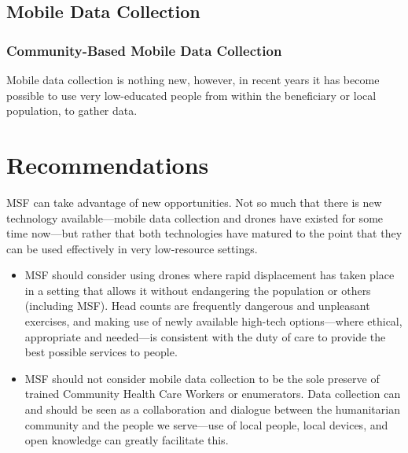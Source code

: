 \documentclass[a4paper,12pt,twoside]{article}
\begin{document}
\subsection{Mobile Data Collection}

\subsubsection{Community-Based Mobile Data Collection}
Mobile data collection is nothing new, however, in recent years it has become possible to use very low-educated people from within the beneficiary or local population, to gather data. 

\section{Recommendations}
MSF can take advantage of new opportunities. Not so much that there is new technology available---mobile data collection and drones have existed for some time now---but rather that both technologies have matured to the point that they can be used effectively in very low-resource settings.

\begin{itemize}
    \item MSF should consider using drones where rapid displacement has taken place in a setting that allows it without endangering the population or others (including MSF). Head counts are frequently dangerous and unpleasant exercises, and making use of newly available high-tech options---where ethical, appropriate and needed---is consistent with the duty of care to provide the best possible services to people.
    \item MSF should not consider mobile data collection to be the sole preserve of trained Community Health Care Workers or enumerators. Data collection can and should be seen as a collaboration and dialogue between the humanitarian community and the people we serve---use of local people, local devices, and open knowledge can greatly facilitate this. 
    
\end{itemize}
\end{document}
